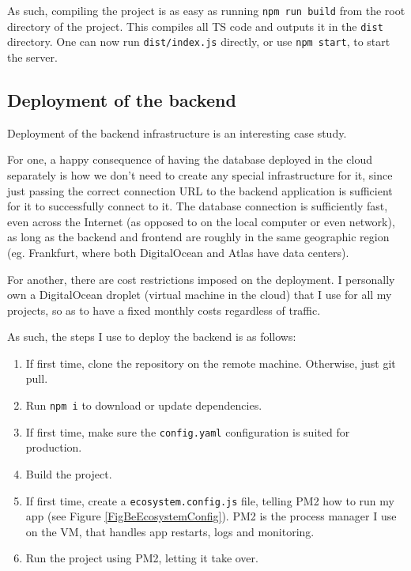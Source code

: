 As such, compiling the project is as easy as running \verb|npm run build| from the root directory of the project. This compiles all TS code and outputs it in the \verb|dist| directory. One can now run \verb|dist/index.js| directly, or use \verb|npm start|, to start the server.

\subsection{Deployment of the backend}
Deployment of the backend infrastructure is an interesting case study.

For one, a happy consequence of having the database deployed in the cloud separately is how we don't need to create any special infrastructure for it, since just passing the correct connection URL to the backend application is sufficient for it to successfully connect to it. The database connection is sufficiently fast, even across the Internet (as opposed to on the local computer or even network), as long as the backend and frontend are roughly in the same geographic region (eg. Frankfurt, where both DigitalOcean and Atlas have data centers).

For another, there are cost restrictions imposed on the deployment. I personally own a DigitalOcean droplet (virtual machine in the cloud) that I use for all my projects, so as to have a fixed monthly costs regardless of traffic.

As such, the steps I use to deploy the backend is as follows:
\begin{enumerate}
    \item If first time, clone the repository on the remote machine. Otherwise, just git pull.
    \item Run \verb|npm i| to download or update dependencies.
    \item If first time, make sure the \verb|config.yaml| configuration is suited for production.
    \item Build the project.
    \item If first time, create a \verb|ecosystem.config.js| file, telling PM2 how to run my app (see Figure \ref{FigBeEcosystemConfig}). PM2 is the process manager I use on the VM, that handles app restarts, logs and monitoring.
    \item Run the project using PM2, letting it take over.
\end{enumerate}

